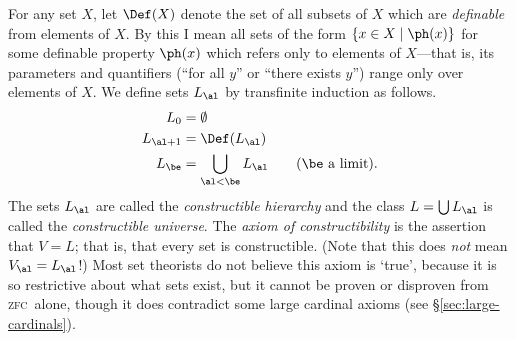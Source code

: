 \documentclass[12pt]{amsart}
\def\zfc{\textsc{zfc}}
\begin{document}
\begin{eg}\label{thm:v=l}
  For any set $X$, let $\Def(X)$ denote the set of all subsets of $X$
  which are \emph{definable} from elements of $X$.  By this I mean all
  sets of the form $\{x\in X \mid \ph(x)\}$ for some definable
  property $\ph(x)$ which refers only to elements of $X$---that is,
  its parameters and quantifiers (``for all $y$'' or ``there exists
  $y$'') range only over elements of $X$.  We define sets $L_\al$ by
  transfinite induction as follows.
  \begin{align*}
    L_0 &= \emptyset\\
    L_{\al+1} &= \Def(L_\al)\\
    L_\be &= \bigcup_{\al<\be} L_\al \qquad\text{($\be$ a limit)}.
  \end{align*}
  The sets $L_\al$ are called the \emph{constructible hierarchy} and
  the class $L=\bigcup L_\al$ is called the \emph{constructible
    universe}.  The \emph{axiom of constructibility} is the assertion
  that $V=L$; that is, that every set is constructible.  (Note that
  this does \emph{not} mean $V_\al=L_\al$!)  Most set theorists do not
  believe this axiom is `true', because it is so restrictive about
  what sets exist, but it cannot be proven or disproven from \zfc\
  alone, though it does contradict some large cardinal axioms (see
  \S\ref{sec:large-cardinals}).
\end{eg}
\end{document}

